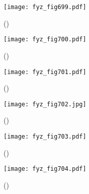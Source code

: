     \begin{figure}[ht!] %
      \centering
      \texttt{[image: fyz\_fig699.pdf]}
      \caption{
               (\cite[s.~707]{Feynman02})}
      \label{fyz:fig699}
    \end{figure}

    \begin{figure}[ht!] %
      \centering
      \texttt{[image: fyz\_fig700.pdf]}
      \caption{
               (\cite[s.~707]{Feynman02})}
      \label{fyz:fig700}
    \end{figure}

    \begin{figure}[ht!] %
      \centering
      \texttt{[image: fyz\_fig701.pdf]}
      \caption{
               (\cite[s.~707]{Feynman02})}
      \label{fyz:fig701}
    \end{figure}

    \begin{figure}[ht!] %
      \centering
      \texttt{[image: fyz\_fig702.jpg]}
      \caption{
               (\cite[s.~707]{Feynman02})}
      \label{fyz:fig702}
    \end{figure}

    \begin{figure}[ht!] %
      \centering
      \texttt{[image: fyz\_fig703.pdf]}
      \caption{
               (\cite[s.~707]{Feynman02})}
      \label{fyz:fig703}
    \end{figure}

    \begin{figure}[ht!] %
      \centering
      \texttt{[image: fyz\_fig704.pdf]}
      \caption{
               (\cite[s.~707]{Feynman02})}
      \label{fyz:fig704}
    \end{figure}

